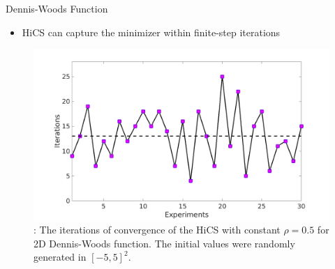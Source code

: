 \documentclass{beamer}
\begin{document}
\begin{frame}{Dennis-Woods Function}
\normalsize{
	\begin{itemize}
		\item HiCS can capture the minimizer within finite-step iterations
	\end{itemize}
	}
\begin{figure}[!htbp]
	\centering
	  \includegraphics[scale=0.22]{./figures/dwoodrand.png}
	\caption{:
\footnotesize{
	The iterations of convergence of the HiCS with
	constant $\rho=0.5$ for 2D Dennis-Woods function. The initial
	values were randomly generated in $[-5,5]^2$.}
}
\label{fig:dwfunrand}
\end{figure}
\end{frame}
\end{document}
